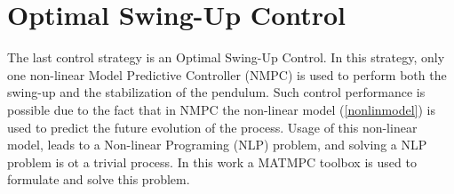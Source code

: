 \section{Optimal Swing-Up Control}
The last control strategy is an Optimal Swing-Up Control. In this strategy, only one non-linear Model Predictive Controller (NMPC) is used to perform both the swing-up and the stabilization of the pendulum. Such control performance is possible due to the fact that in NMPC the non-linear model (\ref{nonlinmodel}) is used to predict the future evolution of the process.  Usage of this non-linear model, leads to a Non-linear Programing (NLP) problem, and solving a NLP problem is ot a trivial process. In this work a \textsc{MATMPC} toolbox is used \cite{MATMPC} to formulate and solve this problem.\\


